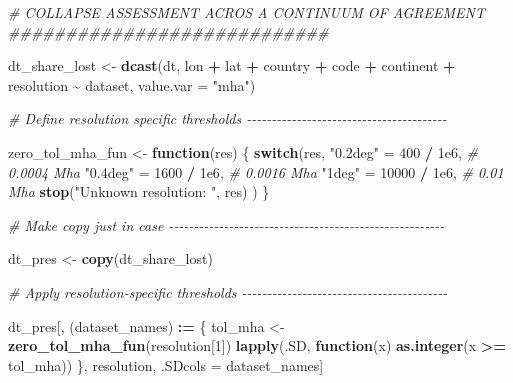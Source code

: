 \documentclass[
  11pt,
]{article}
\newenvironment{Shaded}{\begin{snugshade}}{\end{snugshade}}
\newcommand{\AttributeTok}[1]{\textcolor[rgb]{0.13,0.29,0.53}{#1}}
\newcommand{\CommentTok}[1]{\textcolor[rgb]{0.56,0.35,0.01}{\textit{#1}}}
\newcommand{\ControlFlowTok}[1]{\textcolor[rgb]{0.13,0.29,0.53}{\textbf{#1}}}
\newcommand{\DecValTok}[1]{\textcolor[rgb]{0.00,0.00,0.81}{#1}}
\newcommand{\FloatTok}[1]{\textcolor[rgb]{0.00,0.00,0.81}{#1}}
\newcommand{\FunctionTok}[1]{\textcolor[rgb]{0.13,0.29,0.53}{\textbf{#1}}}
\newcommand{\NormalTok}[1]{#1}
\newcommand{\OtherTok}[1]{\textcolor[rgb]{0.56,0.35,0.01}{#1}}
\newcommand{\SpecialCharTok}[1]{\textcolor[rgb]{0.81,0.36,0.00}{\textbf{#1}}}
\newcommand{\StringTok}[1]{\textcolor[rgb]{0.31,0.60,0.02}{#1}}
\begin{document}
\begin{Shaded}
\begin{Highlighting}[]
\CommentTok{\# COLLAPSE ASSESSMENT ACROS A CONTINUUM OF AGREEMENT \#\#\#\#\#\#\#\#\#\#\#\#\#\#\#\#\#\#\#\#\#\#\#\#\#\#\#\#}

\NormalTok{dt\_share\_lost }\OtherTok{\textless{}{-}} \FunctionTok{dcast}\NormalTok{(dt, lon }\SpecialCharTok{+}\NormalTok{ lat }\SpecialCharTok{+}\NormalTok{ country }\SpecialCharTok{+}\NormalTok{ code }\SpecialCharTok{+}\NormalTok{ continent }\SpecialCharTok{+}\NormalTok{ resolution }\SpecialCharTok{\textasciitilde{}}\NormalTok{ dataset,}
      \AttributeTok{value.var =} \StringTok{"mha"}\NormalTok{)}

\CommentTok{\# Define resolution specific thresholds {-}{-}{-}{-}{-}{-}{-}{-}{-}{-}{-}{-}{-}{-}{-}{-}{-}{-}{-}{-}{-}{-}{-}{-}{-}{-}{-}{-}{-}{-}{-}{-}{-}{-}{-}{-}{-}{-}{-}{-}}

\NormalTok{zero\_tol\_mha\_fun }\OtherTok{\textless{}{-}} \ControlFlowTok{function}\NormalTok{(res) \{}
  \ControlFlowTok{switch}\NormalTok{(res,}
    \StringTok{"0.2deg"} \OtherTok{=} \DecValTok{400}  \SpecialCharTok{/} \FloatTok{1e6}\NormalTok{, }\CommentTok{\# 0.0004 Mha}
    \StringTok{"0.4deg"} \OtherTok{=} \DecValTok{1600} \SpecialCharTok{/} \FloatTok{1e6}\NormalTok{, }\CommentTok{\# 0.0016 Mha}
    \StringTok{"1deg"} \OtherTok{=} \DecValTok{10000} \SpecialCharTok{/} \FloatTok{1e6}\NormalTok{,  }\CommentTok{\# 0.01 Mha}
    \FunctionTok{stop}\NormalTok{(}\StringTok{"Unknown resolution: "}\NormalTok{, res)}
\NormalTok{  )}
\NormalTok{\}}

\CommentTok{\# Make copy just in case {-}{-}{-}{-}{-}{-}{-}{-}{-}{-}{-}{-}{-}{-}{-}{-}{-}{-}{-}{-}{-}{-}{-}{-}{-}{-}{-}{-}{-}{-}{-}{-}{-}{-}{-}{-}{-}{-}{-}{-}{-}{-}{-}{-}{-}{-}{-}{-}{-}{-}{-}{-}{-}{-}{-}}

\NormalTok{dt\_pres }\OtherTok{\textless{}{-}} \FunctionTok{copy}\NormalTok{(dt\_share\_lost)}

\CommentTok{\# Apply resolution{-}specific thresholds {-}{-}{-}{-}{-}{-}{-}{-}{-}{-}{-}{-}{-}{-}{-}{-}{-}{-}{-}{-}{-}{-}{-}{-}{-}{-}{-}{-}{-}{-}{-}{-}{-}{-}{-}{-}{-}{-}{-}{-}{-}}

\NormalTok{dt\_pres[, (dataset\_names) }\SpecialCharTok{:=}\NormalTok{ \{}
\NormalTok{    tol\_mha }\OtherTok{\textless{}{-}} \FunctionTok{zero\_tol\_mha\_fun}\NormalTok{(resolution[}\DecValTok{1}\NormalTok{])}
    \FunctionTok{lapply}\NormalTok{(.SD, }\ControlFlowTok{function}\NormalTok{(x) }\FunctionTok{as.integer}\NormalTok{(x }\SpecialCharTok{\textgreater{}=}\NormalTok{ tol\_mha))}
\NormalTok{    \},}
\NormalTok{    resolution,}
\NormalTok{    .SDcols }\OtherTok{=}\NormalTok{ dataset\_names]}


\end{Highlighting}
\end{Shaded}
\end{document}
